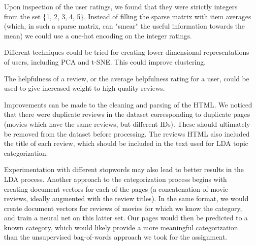 \documentclass[11pt]{article}
\begin{document}
Upon inspection of the user ratings, we found that they were strictly integers from the set \{1, 2, 3, 4, 5\}. Instead of filling the sparse matrix with item averages (which, in such a sparse matrix, can "smear" the useful information towards the mean) we could use a one-hot encoding on the integer ratings.\newline

Different techniques could be tried for creating lower-dimensional representations of users, including PCA and t-SNE. This could improve clustering.\newline

The helpfulness of a review, or the average helpfulness rating for a user, could be used to give increased weight to high quality reviews.\newline

Improvements can be made to the cleaning and parsing of the HTML. We noticed that there were duplicate reviews in the dataset corresponding to duplicate pages (movies which have the same reviews, but different IDs). These should ultimately be removed from the dataset before processing. The reviews HTML also included the title of each review, which should be included in the text used for LDA topic categorization.\newline

Experimentation with different stopwords may also lead to better results in the LDA process. Another approach to the categorization process begins with creating document vectors for each of the pages (a concatenation of movie reviews, ideally augmented with the review titles). In the same format, we would create document vectors for reviews of movies for which we know the category, and train a neural net on this latter set. Our pages would then be predicted to a known category, which would likely provide a more meaningful categorization than the unsupervised bag-of-words approach we took for the assignment.
\end{document}
